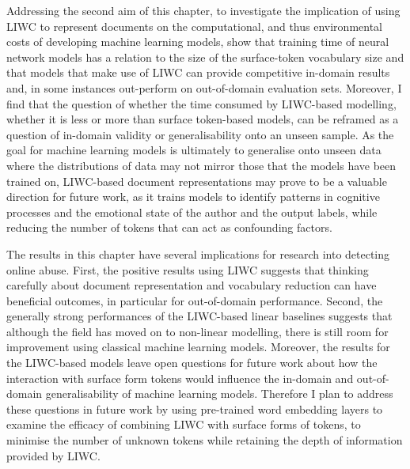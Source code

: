 Addressing the second aim of this chapter, to investigate the implication of using LIWC to represent documents on the computational, and thus environmental costs of developing machine learning models, show that training time of neural network models has a relation to the size of the surface-token vocabulary size and that models that make use of LIWC can provide competitive in-domain results and, in some instances out-perform on out-of-domain evaluation sets. Moreover, I find that the question of whether the time consumed by LIWC-based modelling, whether it is less or more than surface token-based models, can be reframed as a question of in-domain validity or generalisability onto an unseen sample. As the goal for machine learning models is ultimately to generalise onto unseen data where the distributions of data may not mirror those that the models have been trained on, LIWC-based document representations may prove to be a valuable direction for future work, as it trains models to identify patterns in cognitive processes and the emotional state of the author and the output labels, while reducing the number of tokens that can act as confounding factors.

The results in this chapter have several implications for research into detecting online abuse. First, the positive results using LIWC suggests that thinking carefully about document representation and vocabulary reduction can have beneficial outcomes, in particular for out-of-domain performance. Second, the generally strong performances of the LIWC-based linear baselines suggests that although the field has moved on to non-linear modelling, there is still room for improvement using classical machine learning models. Moreover, the results for the LIWC-based models leave open questions for future work about how the interaction with surface form tokens would influence the in-domain and out-of-domain generalisability of machine learning models. Therefore I plan to address these questions in future work by using pre-trained word embedding layers to examine the efficacy of combining LIWC with surface forms of tokens, to minimise the number of unknown tokens while retaining the depth of information provided by LIWC.
